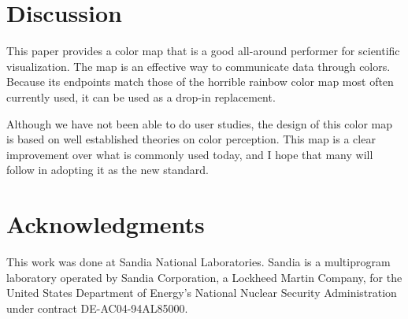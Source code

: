 \documentclass[twocolumn]{article}
\begin{document}
\section{Discussion}
\label{sec:Discussion}

This paper provides a color map that is a good all-around performer for
scientific visualization.  The map is an effective way to communicate data
through colors.  Because its endpoints match those of the horrible rainbow
color map most often currently used, it can be used as a drop-in
replacement.

Although we have not been able to do user studies, the design of this color
map is based on well established theories on color perception.  This map is
a clear improvement over what is commonly used today, and I hope that many
will follow in adopting it as the new standard.


\section{Acknowledgments}

This work was done at Sandia National Laboratories.  Sandia is a
multiprogram laboratory operated by Sandia Corporation, a Lockheed Martin
Company, for the United States Department of Energy's National Nuclear
Security Administration under contract DE-AC04-94AL85000.



\end{document}
